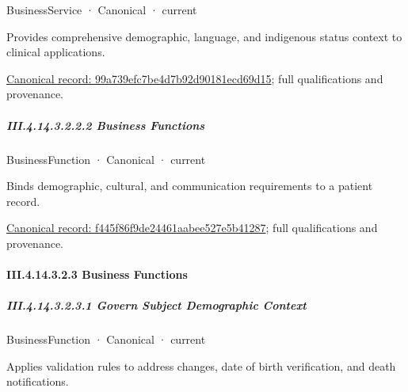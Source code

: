 \label{element:99a739efc7be4d7b92d90181ecd69d15}
{\small BusinessService · Canonical · current}\par

Provides comprehensive demographic, language, and indigenous status context to clinical applications.


{\footnotesize \href{../../../../continuum/business/business-service/99a739efc7be4d7b92d90181ecd69d15.md}{Canonical record: 99a739efc7be4d7b92d90181ecd69d15}; full qualifications and provenance.}\par
\subparagraph*{III.4.14.3.2.2.2 Business Functions}
\label{navigation:III.4.14.3.2.2.2}

\label{navigation:III.4.14.3.2.2.2.1}

\label{element:f445f86f9de24461aabee527e5b41287}
{\small BusinessFunction · Canonical · current}\par

Binds demographic, cultural, and communication requirements to a patient record.


{\footnotesize \href{../../../../continuum/business/business-function/f445f86f9de24461aabee527e5b41287.md}{Canonical record: f445f86f9de24461aabee527e5b41287}; full qualifications and provenance.}\par
\paragraph*{III.4.14.3.2.3 Business Functions}
\label{navigation:III.4.14.3.2.3}

\subparagraph*{III.4.14.3.2.3.1 Govern Subject Demographic Context}
\label{navigation:III.4.14.3.2.3.1}

\label{element:76288dacb9034e0bbf75b43d8afe59d2}
{\small BusinessFunction · Canonical · current}\par

Applies validation rules to address changes, date of birth verification, and death notifications.


